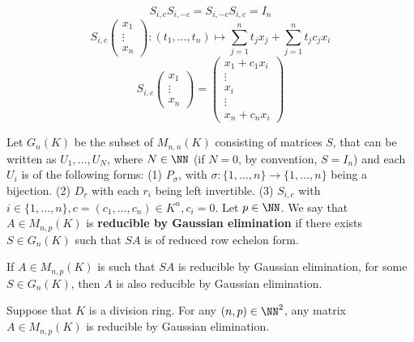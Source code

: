 \begin{box2}
    $$S_{i,c}S_{i,-c}=S_{i,-c}S_{i,c}=I_n$$
    $$S_{i,c}\begin{pmatrix}
 x_1\\
 \vdots\\
x_n
\end{pmatrix}:\left ( t_1,\dots,t_n \right ) \longmapsto\sum_{j=1}^{n}t_jx_j+\sum_{j=1}^{n} t_jc_jx_i $$
$$S_{i,c}\begin{pmatrix}
 x_1\\
 \vdots\\
x_n
\end{pmatrix}=\begin{pmatrix}
 x_1+c_1x_i\\
 \vdots\\
 x_i\\
 \vdots\\
x_n+c_nx_i
\end{pmatrix}$$
\end{box2}
\begin{definitionenv}
    Let $G_n(K)$ be the subset of $M_{n,n}(K)$ consisting of matrices $S$, that can be written as $U_1,\dots,U_N$, where $N\in\NN$ (if $N=0$, by convention, $S=I_n$) and each $U_i$ is of the following forms:
    \newline
    (1) $P_\sigma$, with $\sigma:\{1,\dots,n\}\rightarrow\{1,\dots,n\}$ being a bijection.
    \newline
    (2) $D_{\underline{r}}$ with each $r_i$ being left invertible.
    \newline
    (3) $S_{i,c}$ with $i\in \{1,\dots,n\},c=\left(c_1,\dots,c_n\right)\in K^n,c_i=0$.
    \newline
    Let $p\in\NN$. We say that $A\in M_{n,p}(K)$ is \textbf{reducible by Gaussian elimination} if there exists $S\in G_n(K)$ such that $SA$ is of reduced row echelon form.
\end{definitionenv}
\begin{lemmaenv}
    If $A\in M_{n,p}(K)$ is such that $SA$ is reducible by Gaussian elimination, for some $S\in G_n(K)$, then $A$ is also reducible by Gaussian elimination.
\end{lemmaenv}
\begin{theoremenv}
    Suppose that $K$ is a division ring. For any $(n,p)\in\NN^2$, any matrix $A\in M_{n,p}(K)$ is reducible
    by Gaussian elimination.
\end{theoremenv}

